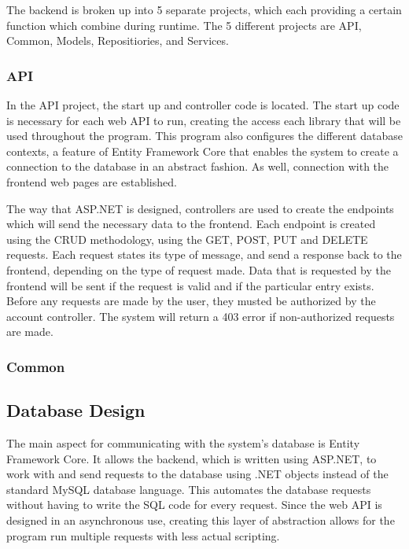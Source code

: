 {{{{{{{{{The backend is broken up into 5 separate projects, which each providing a certain function which combine during runtime. The 5 different projects are API, Common, Models, Repositiories, and Services. 
\newline
{\setlength{\parindent}{0cm}
 
\subsubsection{API}
In the API project, the start up and controller code is located. The start up code is necessary for each web API to run, creating the access each library that will be used throughout the program. This program also configures the different database contexts, a feature of Entity Framework Core that enables the system to create a connection to the database in an abstract fashion. As well, connection with the frontend web pages are established. 
\newline
{\setlength{\parindent}{0cm} 

The way that ASP.NET is designed, controllers are used to create the endpoints which will send the necessary data to the frontend. Each endpoint is created using the CRUD methodology, using the GET, POST, PUT and DELETE requests. Each request states its type of message, and send a response back to the frontend, depending on the type of request made. Data that is requested by the frontend will be sent if the request is valid and if the particular entry exists. Before any requests are made by the user, they musted be authorized by the account controller. The system will return a 403 error if non-authorized requests are made. 

\subsubsection{Common}


\subsection{Database Design}
The main aspect for communicating with the system's database is Entity Framework Core. It allows the backend, which is written using ASP.NET, to work with and send requests to the database using .NET objects instead of the standard MySQL database language. This automates the database requests without having to write the SQL code for every request. Since the web API is designed in an asynchronous use, creating this layer of abstraction allows for the program run multiple requests with less actual scripting. 
\newline
{\setlength{\parindent}{0cm}

}}}}}}}}}}}}
